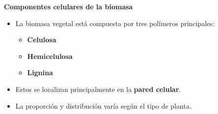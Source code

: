 \documentclass[../../main.tex]{subfiles}
\begin{document}
\begin{frame}{\textbf{Componentes celulares de la biomasa}}
\begin{itemize}
  \item La biomasa vegetal está compuesta por tres polímeros principales:
  \begin{itemize}
    \item \textbf{Celulosa}
    \item \textbf{Hemicelulosa}
    \item \textbf{Lignina}
  \end{itemize}
  \item Estos se localizan principalmente en la \textbf{pared celular}.
  \item La proporción y distribución varía según el tipo de planta.
\end{itemize}
\end{frame}
\end{document}
